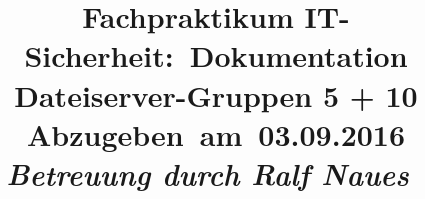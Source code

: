 \renewcommand{\lstlistingname}{Code} %
\newcommand{\code}[1]{\texttt{#1}}   %




\renewcommand{\familydefault}{\sfdefault}
\usepackage{helvet}

\topmargin=-0.45in
\evensidemargin=0in
\oddsidemargin=0in
\textwidth=6.5in
\textheight=9.0in
\headsep=0.25in
\linespread{1.1} %
\setlength\parindent{0pt} %

\setcounter{secnumdepth}{4} %
\setcounter{tocdepth}{3} %

\pagestyle{fancy}
\lhead{} %
\chead{} %
\rhead{\leftmark} %
\lfoot{} %
\rfoot{} %
\renewcommand\headrulewidth{0.4pt} %
\renewcommand\footrulewidth{0.4pt} %


\newcommand{\Title}{Dokumentation Dateiserver-Gruppen 5 + 10} %
\newcommand{\DueDate}{03.09.2016} %
\newcommand{\Class}{Fachpraktikum IT-Sicherheit} %
\newcommand{\ClassTime}{} %
\newcommand{\ClassInstructor}{Ralf Naues} %


\title{
\vspace{0.5in} %
\textmd{\textbf{\Class:\ \Title}}\\
\normalsize\vspace{0.1in}\small{Abzugeben\ am\ \DueDate}\\
\vspace{0.1in}\large{\textit{Betreuung durch \ClassInstructor\ \ClassTime}}
\vspace{1in} %
}

